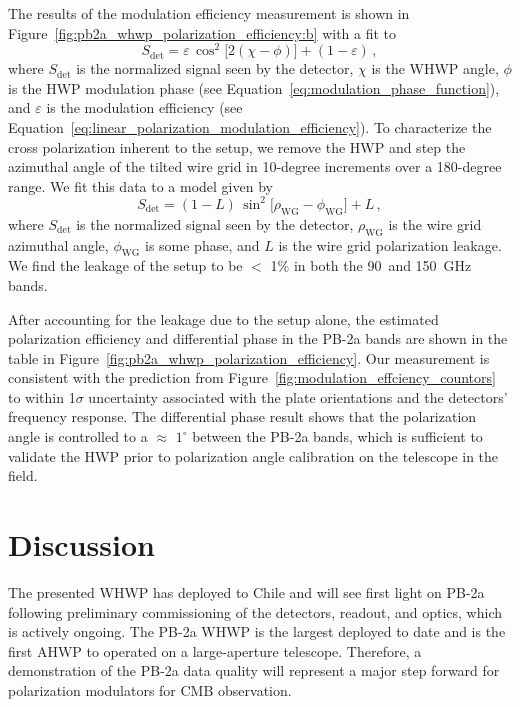 The results of the modulation efficiency measurement is shown in Figure~\ref{fig:pb2a_whwp_polarization_efficiency:b} with a fit to
\begin{equation}
	S_{\mathrm{det}} = \varepsilon \, \cos^{2}\Big[2 (\chi - \phi)\Big] + (1 - \varepsilon) \, ,
\label{eq:fitPol}
\end{equation} 
where $S_{\mathrm{det}}$ is the normalized signal seen by the detector, $\chi$ is the WHWP angle, $\phi$ is the HWP modulation phase (see Equation~\ref{eq:modulation_phase_function}), and $\varepsilon$ is the modulation efficiency (see Equation~\ref{eq:linear_polarization_modulation_efficiency}). To characterize the cross polarization inherent to the setup, we remove the HWP and step the azimuthal angle of the tilted wire grid in 10-degree increments over a 180-degree range. We fit this data to a model given by
\begin{equation}
	S_{\mathrm{det}} = (1 - L) \, \sin^{2}\Big[\rho_{\mathrm{WG}} - \phi_{\mathrm{WG}}\Big] + L \, ,
\label{eq:wg}
\end{equation} 
where $S_{\mathrm{det}}$ is the normalized signal seen by the detector, $\rho_{\mathrm{WG}}$ is the wire grid azimuthal angle, $\phi_{\mathrm{WG}}$ is some phase, and $L$ is the wire grid polarization leakage. We find the leakage of the setup to be $<$ 1\% in both the 90~and 150~GHz bands.

After accounting for the leakage due to the setup alone, the estimated polarization efficiency and differential phase in the PB-2a bands are shown in the table in Figure~\ref{fig:pb2a_whwp_polarization_efficiency}. Our measurement is consistent with the prediction from Figure~\ref{fig:modulation_effciency_countors} to within 1$\sigma$ uncertainty associated with the plate orientations and the detectors' frequency response. The differential phase result shows that the polarization angle is controlled to a $\approx$ $1^{\circ}$ between the PB-2a bands, which is sufficient to validate the HWP prior to polarization angle calibration on the telescope in the field.


\section{Discussion}
\label{sec:pb2a_whwp_discussion}

The presented WHWP has deployed to Chile and will see first light on PB-2a following preliminary commissioning of the detectors, readout, and optics, which is actively ongoing. The PB-2a WHWP is the largest deployed to date and is the first AHWP to operated on a large-aperture telescope. Therefore, a demonstration of the PB-2a data quality will represent a major step forward for polarization modulators for CMB observation.

